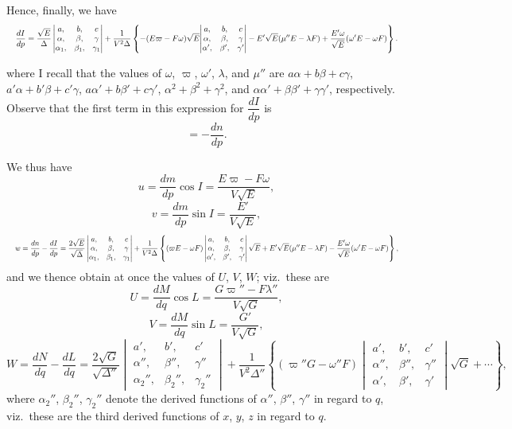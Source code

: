 \documentclass[11pt]{article}
\begin{document}
Hence, finally, we have
\[ \resizebox{\textwidth}{!}{$\displaystyle
\frac{dI}{dp} = \frac{\sqrt{E}}{\Delta}
\begin{vmatrix} a, & b, & c \\ \alpha, & \beta, & \gamma \\ \alpha_1, & \beta_1, & \gamma_1 \end{vmatrix}
+ \frac{1}{V^2\Delta}\left\{-(E\varpi-F\omega)\sqrt{E}\!
\begin{vmatrix} a, & b, & c \\ \alpha, & \beta, & \gamma \\ \alpha', & \beta', & \gamma' \end{vmatrix}
- E'\sqrt{E}(\mu''E-\lambda F) + \frac{E'\omega}{\sqrt{E}}(\omega'E-\omega F)\right\}.
$} \]

where I recall that the values of $\omega$, $\varpi$, $\omega'$, $\lambda$, and $\mu''$ are $a\alpha+b\beta+c\gamma$, $a'\alpha+b'\beta+c'\gamma$, $a\alpha'+b\beta'+c\gamma'$, $\alpha^2+\beta^2+\gamma^2$, and $\alpha\alpha'+\beta\beta'+\gamma\gamma'$, respectively. Observe that the first term in this expression for $\dfrac{dI}{dp}$ is
\[
= -\frac{dn}{dp}.
\]

We thus have
\[
u = \frac{dm}{dp}\cos I = \frac{E\varpi-F\omega}{V\sqrt{E}},
\]
\[
v = \frac{dm}{dp}\sin I = \frac{E'}{V\sqrt{E}},
\]
\[ \resizebox{\textwidth}{!}{$\displaystyle
w = \frac{dn}{dp} - \frac{dI}{dp} = \frac{2\sqrt{E}}{\sqrt{\Delta}}
\begin{vmatrix} a, & b, & c \\ \alpha, & \beta, & \gamma \\ \alpha_1, & \beta_1, & \gamma_1 \end{vmatrix}
+ \frac{1}{V^2\Delta}\left\{(\varpi E-\omega F)
\begin{vmatrix} a, & b, & c \\ \alpha, & \beta, & \gamma \\ \alpha', & \beta', & \gamma' \end{vmatrix}\sqrt{E}
+ E'\sqrt{E}(\mu''E-\lambda F) - \frac{E'\omega}{\sqrt{E}}(\omega'E-\omega F)\right\},
$} \]
and we thence obtain at once the values of $U$, $V$, $W$; viz.\ these are
\[
U = \frac{dM}{dq}\cos L = \frac{G\varpi'' - F\lambda''}{V\sqrt{G}},
\]
\[
V = \frac{dM}{dq}\sin L = \frac{G'}{V\sqrt{G}},
\]
\[
W = \frac{dN}{dq} - \frac{dL}{dq} = \frac{2\sqrt{G}}{\sqrt{\Delta''}}
\begin{vmatrix} a', & b', & c' \\ \alpha'', & \beta'', & \gamma'' \\ \alpha_2'', & \beta_2'', & \gamma_2'' \end{vmatrix}
+ \frac{1}{V^2\Delta''}\left\{(\varpi'' G - \omega'' F)\!
\begin{vmatrix} a', & b', & c' \\ \alpha'', & \beta'', & \gamma'' \\ \alpha', & \beta', & \gamma' \end{vmatrix}\sqrt{G} + \cdots\right\},
\]
where $\alpha_2''$, $\beta_2''$, $\gamma_2''$ denote the derived functions of $\alpha''$, $\beta''$, $\gamma''$ in regard to $q$, viz.\ these are the third derived functions of $x$, $y$, $z$ in regard to $q$.
\end{document}
